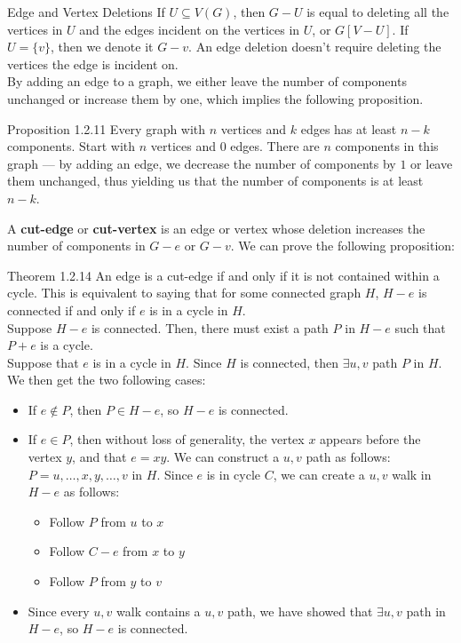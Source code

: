 \documentclass[10pt]{extarticle}
\begin{document}
\begin{problem}{Edge and Vertex Deletions}
  If $U\subseteq V(G)$, then $G-U$ is equal to deleting all the vertices in $U$ and the edges incident on the vertices in $U$, or $G[V-U]$. If $U = \{v\}$, then we denote it $G-v$. An edge deletion doesn't require deleting the vertices the edge is incident on.\\

  By adding an edge to a graph, we either leave the number of components unchanged or increase them by one, which implies the following proposition.
  \begin{problem}{Proposition 1.2.11}
    Every graph with $n$ vertices and $k$ edges has at least $n-k$ components.
    \tcblower
    Start with $n$ vertices and $0$ edges. There are $n$ components in this graph --- by adding an edge, we decrease the number of components by $1$ or leave them unchanged, thus yielding us that the number of components is at least $n-k$.
  \end{problem}
  A \textbf{cut-edge} or \textbf{cut-vertex} is an edge or vertex whose deletion increases the number of components in $G-e$ or $G-v$. We can prove the following proposition:
  \begin{problem}{Theorem 1.2.14}
    An edge is a cut-edge if and only if it is not contained within a cycle.
    \tcblower
    This is equivalent to saying that for some connected graph $H$, $H-e$ is connected if and only if $e$ is in a cycle in $H$.\\

    Suppose $H-e$ is connected. Then, there must exist a path $P$ in $H-e$ such that $P+e$ is a cycle.\\

    Suppose that $e$ is in a cycle in $H$. Since $H$ is connected, then $\exists u,v$ path $P$ in $H$. We then get the two following cases:
    \begin{itemize}
      \item If $e\notin P$, then $P\in H-e$, so $H-e$ is connected.
      \item If $e\in P$, then without loss of generality, the vertex $x$ appears before the vertex $y$, and that $e = xy$. We can construct a $u,v$ path as follows: $P = u,\dots,x,y,\dots, v$ in $H$. Since $e$ is in cycle $C$, we can create a $u,v$ walk in $H-e$ as follows:
        \begin{itemize}
          \item Follow $P$ from $u$ to $x$
          \item Follow $C-e$ from $x$ to $y$
          \item Follow $P$ from $y$ to $v$
        \end{itemize}
      \item Since every $u,v$ walk contains a $u,v$ path, we have showed that $\exists u,v$ path in $H-e$, so $H-e$ is connected.
    \end{itemize}
  \end{problem}
\end{problem}
\end{document}
